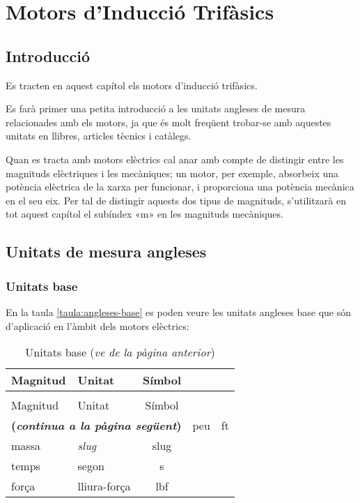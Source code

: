 
\chapter{Motors d'Inducció Trifàsics}\label{sec:ch-motors-ind}

\section{Introducció}

Es tracten en aquest capítol els motors d'inducció trifàsics.

Es farà primer una petita introducció a les unitats angleses de mesura  relacionades amb els motors, ja que és molt freqüent trobar-se amb aquestes unitats en llibres, articles tècnics i catàlegs.

Quan es tracta amb motors elèctrics cal anar amb compte de distingir  entre les magnituds elèctriques i les mecàniques; un motor, per exemple, absorbeix una potència elèctrica de la xarxa per funcionar, i proporciona una potència mecànica en el seu eix. Per tal de distingir aquests dos tipus de magnituds, s'utilitzarà en tot aquest capítol el subíndex «m» en les magnituds mecàniques.

\section{Unitats de mesura angleses}

\subsection{Unitats base}

En la taula \vref{taula:angleses-base} es poden veure les unitats angleses base  que són d'aplicació en l'àmbit dels motors elèctrics:
\begin{longtable}[h]{llc}
   \caption{\label{taula:angleses-base}Unitats angleses base}\\
   \toprule[1pt]
    Magnitud & Unitat & Símbol \\
   \midrule
   \endfirsthead
   \caption[]{Unitats base (\emph{ve de la pàgina anterior})}\\
   \toprule[1pt]
    Magnitud & Unitat & Símbol \\
   \midrule
   \endhead
   \midrule
   \multicolumn{3}{r}{\sffamily\bfseries\color{NavyBlue}(\emph{continua a la pàgina següent})}
   \endfoot
   \endlastfoot
   longitud & peu & ft \\
   massa & \textit{slug} & slug \\
   temps & segon & s\\
   força & lliura-força & lbf \\
   \bottomrule[1pt]
\end{longtable}

